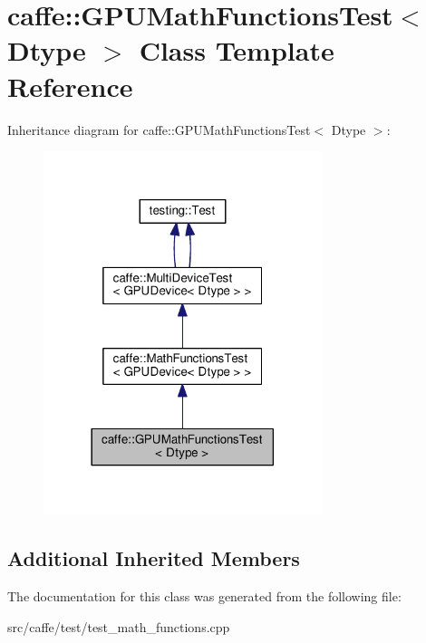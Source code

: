 \hypertarget{classcaffe_1_1_g_p_u_math_functions_test}{}\section{caffe\+:\+:G\+P\+U\+Math\+Functions\+Test$<$ Dtype $>$ Class Template Reference}
\label{classcaffe_1_1_g_p_u_math_functions_test}


Inheritance diagram for caffe\+:\+:G\+P\+U\+Math\+Functions\+Test$<$ Dtype $>$\+:
\nopagebreak
\begin{figure}[H]
\begin{center}
\leavevmode
\includegraphics[width=230pt]{classcaffe_1_1_g_p_u_math_functions_test__inherit__graph}
\end{center}
\end{figure}
\subsection*{Additional Inherited Members}


The documentation for this class was generated from the following file\+:\begin{DoxyCompactItemize}
\item 
src/caffe/test/test\+\_\+math\+\_\+functions.\+cpp\end{DoxyCompactItemize}
